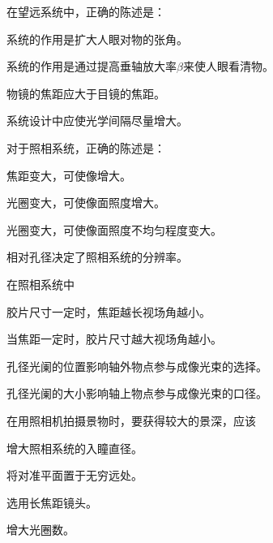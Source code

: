 \documentclass[padl, analysis, notocnum]{ExBook}
\newcommand{\answerarea}[1][3.5cm]{%
  \par\vspace{1mm}%
  \noindent{\color{themeColor!35}\rule{\linewidth}{0.4pt}}\par
  \noindent\begin{minipage}[t][#1][t]{\linewidth}\vspace{0pt}\end{minipage}\par
  \noindent{\color{themeColor!35}\rule{\linewidth}{0.4pt}}\par
}
\begin{document}
\begin{qitems}[startnum=11]
\qitem 在望远系统中，正确的陈述是：
\par\noindent\hspace{2em}系统的作用是扩大人眼对物的张角。
\par\noindent\hspace{2em}系统的作用是通过提高垂轴放大率$\beta$来使人眼看清物。
\par\noindent\hspace{2em}物镜的焦距应大于目镜的焦距。
\par\noindent\hspace{2em}系统设计中应使光学间隔尽量增大。
\label{q:141:start}
\answerarea[4.0cm]
\label{q:141:end}
\end{qitems}

\begin{qitems}[startnum=12]
\qitem 对于照相系统，正确的陈述是：
\par\noindent\hspace{2em}焦距变大，可使像增大。
\par\noindent\hspace{2em}光圈变大，可使像面照度增大。
\par\noindent\hspace{2em}光圈变大，可使像面照度不均匀程度变大。
\par\noindent\hspace{2em}相对孔径决定了照相系统的分辨率。
\label{q:142:start}
\answerarea[4.0cm]
\label{q:142:end}
\end{qitems}

\begin{qitems}[startnum=13]
\qitem 在照相系统中
\par\noindent\hspace{2em}胶片尺寸一定时，焦距越长视场角越小。
\par\noindent\hspace{2em}当焦距一定时，胶片尺寸越大视场角越小。
\par\noindent\hspace{2em}孔径光阑的位置影响轴外物点参与成像光束的选择。
\par\noindent\hspace{2em}孔径光阑的大小影响轴上物点参与成像光束的口径。
\label{q:143:start}
\answerarea[4.0cm]
\label{q:143:end}
\end{qitems}

\begin{qitems}[startnum=14]
\qitem 在用照相机拍摄景物时，要获得较大的景深，应该
\par\noindent\hspace{2em}增大照相系统的入瞳直径。
\par\noindent\hspace{2em}将对准平面置于无穷远处。
\par\noindent\hspace{2em}选用长焦距镜头。
\par\noindent\hspace{2em}增大光圈数。
\label{q:144:start}
\answerarea[4.0cm]
\label{q:144:end}
\end{qitems}
\end{document}
